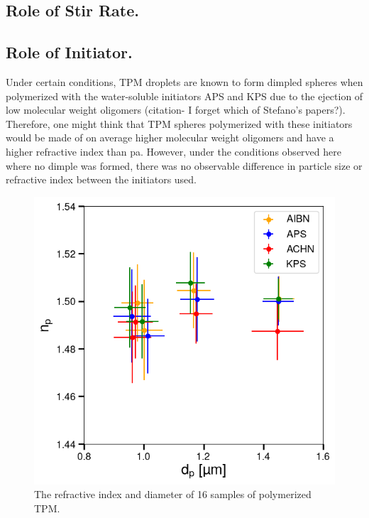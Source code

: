 \subsection{Role of Stir Rate.}

\subsection{Role of Initiator.}
Under certain conditions, TPM droplets are known to form dimpled spheres when polymerized with the water-soluble initiators APS and KPS due to the ejection of low molecular weight oligomers (citation- I forget which of Stefano's papers?). Therefore, one might think that TPM spheres polymerized with these initiators would be made of on average higher molecular weight oligomers and have a higher refractive index than pa. However, under the conditions observed here where no dimple was formed, there was no observable difference in particle size or refractive index between the initiators used.

\begin{figure}
    \centering
    \includegraphics[width=0.75\columnwidth]{figures/may_data_summary.png}
    \caption{The refractive index and diameter of 16 samples of 
    polymerized TPM.}
    \label{fig:initiator_data}
\end{figure}

